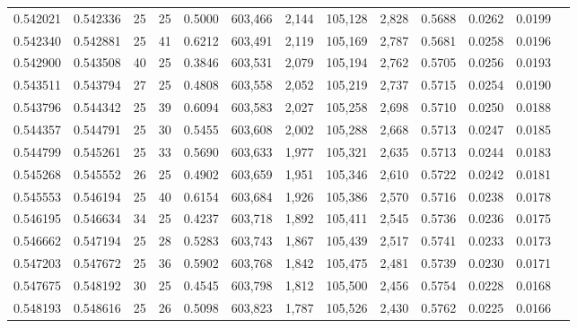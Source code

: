 \begin{tabular}{rrrrrrrrrrrrr}
0.542021 & 0.542336 &    25 &  25 &                                     0.5000 & 603,466 &   2,144 & 105,128 &   2,828 & 0.5688 & 0.0262 & 0.0199 \\
0.542340 & 0.542881 &    25 &  41 &                                     0.6212 & 603,491 &   2,119 & 105,169 &   2,787 & 0.5681 & 0.0258 & 0.0196 \\
0.542900 & 0.543508 &    40 &  25 &                                     0.3846 & 603,531 &   2,079 & 105,194 &   2,762 & 0.5705 & 0.0256 & 0.0193 \\
0.543511 & 0.543794 &    27 &  25 &                                     0.4808 & 603,558 &   2,052 & 105,219 &   2,737 & 0.5715 & 0.0254 & 0.0190 \\
0.543796 & 0.544342 &    25 &  39 &                                     0.6094 & 603,583 &   2,027 & 105,258 &   2,698 & 0.5710 & 0.0250 & 0.0188 \\
0.544357 & 0.544791 &    25 &  30 &                                     0.5455 & 603,608 &   2,002 & 105,288 &   2,668 & 0.5713 & 0.0247 & 0.0185 \\
0.544799 & 0.545261 &    25 &  33 &                                     0.5690 & 603,633 &   1,977 & 105,321 &   2,635 & 0.5713 & 0.0244 & 0.0183 \\
0.545268 & 0.545552 &    26 &  25 &                                     0.4902 & 603,659 &   1,951 & 105,346 &   2,610 & 0.5722 & 0.0242 & 0.0181 \\
0.545553 & 0.546194 &    25 &  40 &                                     0.6154 & 603,684 &   1,926 & 105,386 &   2,570 & 0.5716 & 0.0238 & 0.0178 \\
0.546195 & 0.546634 &    34 &  25 &                                     0.4237 & 603,718 &   1,892 & 105,411 &   2,545 & 0.5736 & 0.0236 & 0.0175 \\
0.546662 & 0.547194 &    25 &  28 &                                     0.5283 & 603,743 &   1,867 & 105,439 &   2,517 & 0.5741 & 0.0233 & 0.0173 \\
0.547203 & 0.547672 &    25 &  36 &                                     0.5902 & 603,768 &   1,842 & 105,475 &   2,481 & 0.5739 & 0.0230 & 0.0171 \\
0.547675 & 0.548192 &    30 &  25 &                                     0.4545 & 603,798 &   1,812 & 105,500 &   2,456 & 0.5754 & 0.0228 & 0.0168 \\
0.548193 & 0.548616 &    25 &  26 &                                     0.5098 & 603,823 &   1,787 & 105,526 &   2,430 & 0.5762 & 0.0225 & 0.0166 \\

\end{tabular}

